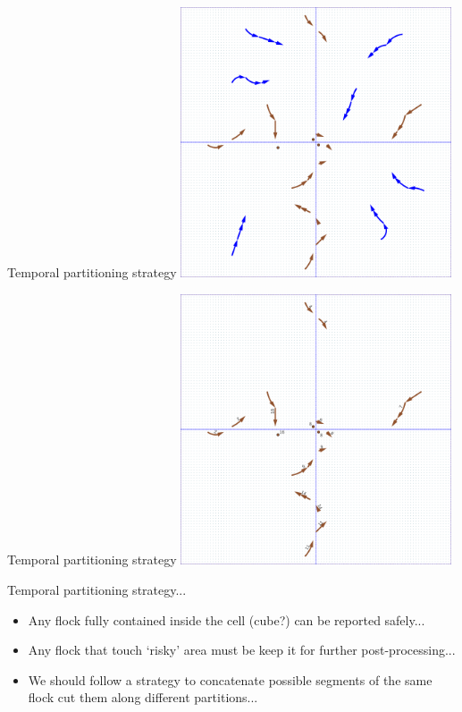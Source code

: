 \documentclass{beamer}
\begin{document}
\begin{frame}{Temporal partitioning strategy}
    \centering
    \includegraphics[width=0.6\textwidth]{figures/report}
\end{frame}

\begin{frame}{Temporal partitioning strategy}
    \centering
    \includegraphics[width=0.6\textwidth]{figures/reduce}
\end{frame}

\begin{frame}{Temporal partitioning strategy...}
    \begin{itemize}
        \item Any flock fully contained inside the cell (cube?) can be reported safely...
        \item Any flock that touch `risky' area must be keep it for further post-processing...
        \item We should follow a strategy to concatenate possible segments of the same flock cut them along different partitions...
    \end{itemize}
\end{frame}
\end{document}
